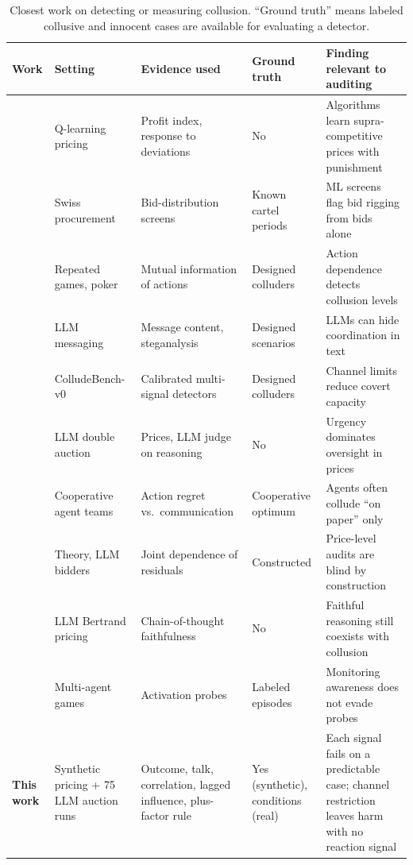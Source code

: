 \documentclass[10pt]{article}
\begin{document}
\begin{table}[t]\centering\footnotesize
\setlength{\tabcolsep}{4pt}
\begin{tabularx}{\linewidth}{@{}>{\raggedright\arraybackslash}p{2.45cm}>{\raggedright\arraybackslash}p{2.6cm}>{\raggedright\arraybackslash}p{3.0cm}>{\raggedright\arraybackslash}p{1.75cm}>{\raggedright\arraybackslash}X@{}}\toprule
Work & Setting & Evidence used & Ground truth & Finding relevant to auditing\\\midrule
\citet{calvano} & Q-learning pricing & Profit index, response to deviations & No & Algorithms learn supra-competitive prices with punishment\\
\citet{huber} & Swiss procurement & Bid-distribution screens & Known cartel periods & ML screens flag bid rigging from bids alone\\
\citet{bonjour} & Repeated games, poker & Mutual information of actions & Designed colluders & Action dependence detects collusion levels\\
\citet{motwani} & LLM messaging & Message content, steganalysis & Designed scenarios & LLMs can hide coordination in text\\
\citet{tailor} & ColludeBench-v0 & Calibrated multi-signal detectors & Designed colluders & Channel limits reduce covert capacity\\
\citet{agrawal} & LLM double auction & Prices, LLM judge on reasoning & No & Urgency dominates oversight in prices\\
\citet{nakamura} & Cooperative agent teams & Action regret vs.\ communication & Cooperative optimum & Agents often collude ``on paper'' only\\
\citet{xu} & Theory, LLM bidders & Joint dependence of residuals & Constructed & Price-level audits are blind by construction\\
\citet{leepark} & LLM Bertrand pricing & Chain-of-thought faithfulness & No & Faithful reasoning still coexists with collusion\\
\citet{das} & Multi-agent games & Activation probes & Labeled episodes & Monitoring awareness does not evade probes\\\midrule
\textbf{This work} & Synthetic pricing + 75 LLM auction runs & Outcome, talk, correlation, lagged influence, plus-factor rule & Yes (synthetic), conditions (real) & Each signal fails on a predictable case; channel restriction leaves harm with no reaction signal\\\bottomrule
\end{tabularx}
\caption{Closest work on detecting or measuring collusion. ``Ground truth'' means labeled collusive and innocent cases are available for evaluating a detector.}\label{tab:related}
\end{table}
\end{document}

